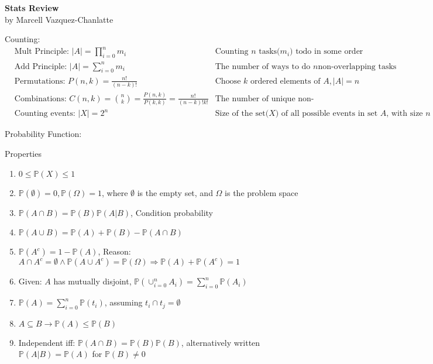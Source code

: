 \documentclass[12pt]{article}
\newcommand{\abs}[1]{\left| #1 \right|} %
\renewcommand{\=}[1]{\stackrel{#1}{=}} %
\theoremstyle{definition}
\theoremstyle{remark}
\begin{document}
\begin{center}
  {\LARGE
    \textbf{Stats Review}\\
    \normalsize
    \textnormal {by Marcell Vazquez-Chanlatte}
    \\[1ex]}

  
\end{center}

Counting:
\begin{align*}
  & \textrm{Mult Principle:  } \abs{A}= \displaystyle\prod_{i = 0}^{n}
  m_i & \textrm{Counting $n$ tasks($m_i$) todo in some
    order}\\
  & \textrm{Add Principle: } \abs{A} = \sum_{i=0}^n m_i & \textrm{The number of ways to do $n$
    non-overlapping tasks}\\
  & \textrm{Permutations: } P(n,k) = \frac{n!}{(n-k)!} & \textrm{Choose $k$ ordered elements of $A, \abs{A}=
    n$} \\
  & \textrm{Combinations: }
  C(n,k) = \binom{n}{k} = \frac{P(n,k)}{P(k,k)} =
  \frac{n!}{(n-k)!k!} & \textrm{The number of unique non-ordered
    lists}\\
  & \textrm{Counting events: } \abs{X} =
  2^n & \textrm{Size of the set($X$) of all possible events in set
    $A$, with size $n$}
\end{align*}

\begin{description}
\item Probability Function:
\item Properties
  \begin{enumerate}
  \item $0 \leq \mathbb{P}(X) \leq 1$
  \item $\mathbb{P}(\emptyset) = 0, \mathbb{P}(\Omega)=1$, where
    $\emptyset$ is the empty set, and $\Omega$ is the problem space
  \item $\mathbb{P}(A\cap B) = \mathbb{P}(B)\mathbb{P}(A | B)$,
    Condition probability
  \item $\mathbb{P}(A\cup B) = \mathbb{P}(A) + \mathbb{P}(B) -
    \mathbb{P}(A\cap B)$
  \item $\mathbb{P}(A^c) = 1-\mathbb{P}(A)$, Reason: $A\cap A^c =
    \emptyset \wedge \mathbb{P}(A\cup A^c) = \mathbb{P}(\Omega)
    \Rightarrow \mathbb{P}(A)+\mathbb{P}(A^c) = 1$
  \item Given: $A$ has mutually disjoint, $\mathbb{P}(\cup_{i=0}^n
    A_i) = \sum_{i=0}^n\mathbb{P}(A_i) $
  \item $\mathbb{P}(A)=\sum_{i=0}^n\mathbb{P}({t_i})$, assuming ${t_i}\cap {t_j} = \emptyset$
  \item $A\subseteq B \rightarrow \mathbb{P}(A)\leq \mathbb{P}(B)$
  \item Independent iff: $\mathbb{P}(A\cap B) =
    \mathbb{P}(B)\mathbb{P}(B)$, alternatively written
    $\mathbb{P}(A|B) = \mathbb{P}(A)$ for $\mathbb{P}(B) \neq 0$ 
  \end{enumerate}
\end{description}
\end{document}
